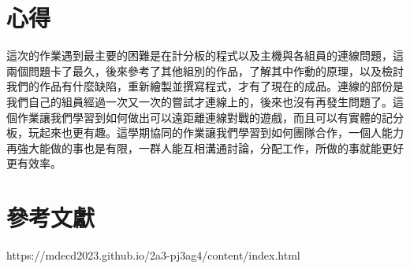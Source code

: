 \chapter{心得}
這次的作業遇到最主要的困難是在計分板的程式以及主機與各組員的連線問題，這兩個問題卡了最久，後來參考了其他組別的作品，了解其中作動的原理，以及檢討我們的作品有什麼缺陷，重新繪製並撰寫程式，才有了現在的成品。連線的部份是我們自己的組員經過一次又一次的嘗試才連線上的，後來也沒有再發生問題了。這個作業讓我們學習到如何做出可以遠距離連線對戰的遊戲，而且可以有實體的記分板，玩起來也更有趣。這學期協同的作業讓我們學習到如何團隊合作，一個人能力再強大能做的事也是有限，一群人能互相溝通討論，分配工作，所做的事就能更好更有效率。\\
\newpage

\chapter{參考文獻}
https://mdecd2023.github.io/2a3-pj3ag4/content/index.html\\
\newpage